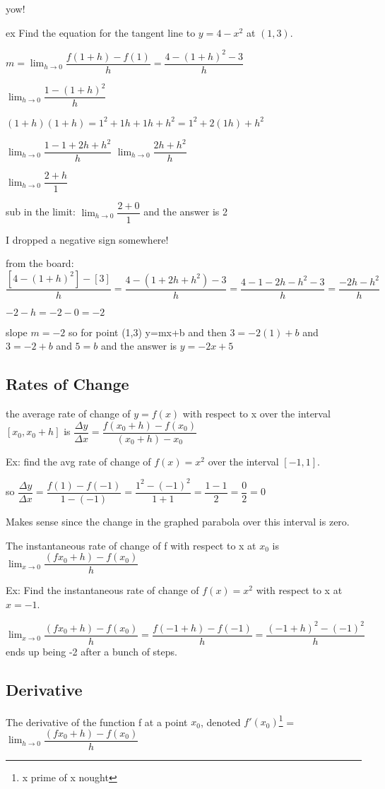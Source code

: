 \documentclass[12pt]{article}
\begin{document}
yow!

ex Find the equation for the tangent line to $y=4-x^{2}$ at $(1,3)$.

$m = \lim_{h\to0}\dfrac{f(1+h)-f(1)}{h} = \dfrac{4-(1+h)^{2}-3}{h}$

$\lim_{h\to0}\dfrac{1-(1+h)^{2}}{h}$

$(1+h)(1+h) = 1^2+1h+1h+h^2 = 1^{2} + 2(1h) + h^{2}$

$\lim_{h\to0}\dfrac{1-1+2h+h^{2}}{h}$
$\lim_{h\to0}\dfrac{2h+h^{2}}{h}$

$\lim_{h\to0}\dfrac{2+h}{1}$

sub in the limit:
$\lim_{h\to0}\dfrac{2+0}{1}$
and the answer is 2

I dropped a negative sign somewhere!

from the board:
$\dfrac{[4-(1+h)^{2}]-[3]}{h} = \dfrac{4-(1+2h+h^{2})-3}{h} = \dfrac{4-1-2h-h^{2}-3}{h} =
\dfrac{-2h-h^{2}}{h}$

$-2-h = -2-0 = -2$

slope $m=-2$ so for point (1,3) y=mx+b and then $3=-2(1)+b$ and $3=-2+b$ and $5=b$ 
and the answer is $y=-2x+5$

\subsection{Rates of Change}

the average rate of change of $y=f(x)$ with respect to x over the interval $[x_{0},x_{0}+h]$ is $\dfrac{\Delta
  y}{\Delta x} = \dfrac{f(x_{0}+h)-f(x_{0})}{(x_{0}+h)-x_{0}}$

Ex: find the avg rate of change of $f(x)=x^{2}$ over the interval $[-1,1]$.

so $\dfrac{\Delta y}{\Delta x} = \dfrac{f(1)-f(-1)}{1-(-1)} = \dfrac{1^{2}-(-1)^{2}}{1+1} = \dfrac{1-1}{2} =
\dfrac{0}{2} = 0$

Makes sense since the change in the graphed parabola over this interval is zero.

The instantaneous rate of change of f with respect to x at $x_{0}$ is $\lim_{x\to
  0}\dfrac{(fx_{0}+h)-f(x_{0})}{h}$

Ex: Find the instantaneous rate of change of $f(x)=x^{2}$ with respect to x at $x=-1$.

$\lim_{x\to 0}\dfrac{(fx_{0}+h)-f(x_{0})}{h} = \dfrac{f(-1+h)-f(-1)}{h} = \dfrac{(-1+h)^{2}-(-1)^{2}}{h}$ ends
up being -2 after a bunch of steps.

\subsection{Derivative}
The derivative of the function f at a point $x_{0}$, denoted $f'(x_{0})$\footnote{x prime of x nought} = $\lim_{h\to 0}\dfrac{(fx_{0}+h)-f(x_{0})}{h}$
\end{document}
